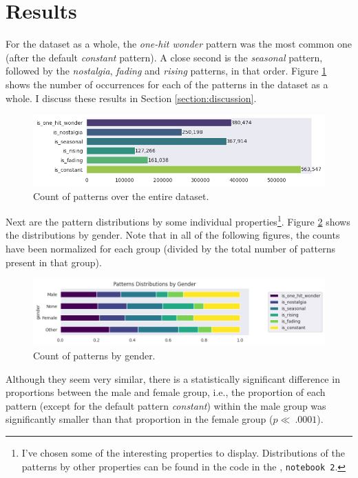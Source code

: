 \documentclass[titlepage]{article}
\newcommand{\ohw}{\textit{one-hit wonder}\xspace}
\newcommand{\nos}{\textit{nostalgia}\xspace}
\newcommand{\sea}{\textit{seasonal}\xspace}
\newcommand{\ris}{\textit{rising}\xspace}
\newcommand{\fad}{\textit{fading}\xspace}
\newcommand{\const}{\textit{constant}\xspace}
\begin{document}
\section{Results}
For the dataset as a whole, the \ohw pattern was the most common one (after the default \const pattern). A close second is the \sea pattern, followed by the \nos, \fad and \ris patterns, in that order. Figure \ref{fig:global-dist} shows the number of occurrences for each of the patterns in the dataset as a whole. I discuss these results in Section \ref{section:discussion}.

\begin{figure}[H]
    \centering
    \includegraphics[width=0.7\linewidth]{figures/global_distribution.png}
    \caption{Count of patterns over the entire dataset.}
    \label{fig:global-dist}
\end{figure}

Next are the pattern distributions by some individual properties\footnote{I've chosen some of the interesting properties to display. Distributions of the patterns by other properties can be found in the code in the , \texttt{notebook 2}.}. Figure \ref{fig:gender} shows the distributions by gender. Note that in all of the following figures, the counts have been normalized for each group (divided by the total number of patterns present in that group).

\begin{figure}[H]
    \centering
    \includegraphics[width=0.6\linewidth]{figures/genders.png}
    \caption{Count of patterns by gender.}
    \label{fig:gender}
\end{figure}

Although they seem very similar, there is a statistically significant difference in proportions between the male and female group, i.e., the proportion of each pattern (except for the default pattern \const) within the male group was significantly smaller than that proportion in the female group ($p \ll\ .0001$).
\end{document}
